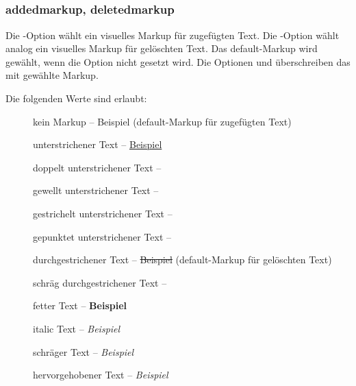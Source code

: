 \begin{chusage}
		\>\\
	\usageexample
		\> \Corresponds\ \\
		\>\\
		\>\\
		\>
\end{chusage}

\subsubsection{addedmarkup, deletedmarkup}

Die -Option wählt ein visuelles Markup für zugefügten Text.
Die -Option wählt analog ein visuelles Markup für gelöschten Text.
Das default-Markup wird gewählt, wenn die Option nicht gesetzt wird.
Die Optionen  und  überschreiben das mit  gewählte Markup.

Die folgenden Werte sind erlaubt:
\begin{description}
	\item [] kein Markup -- Beispiel (default-Markup für zugefügten Text)
	\item [] unterstrichener Text -- \uline{Beispiel}
	\item [] doppelt unterstrichener Text -- 
	\item [] gewellt unterstrichener Text -- 
	\item [] gestrichelt unterstrichener Text -- 
	\item [] gepunktet unterstrichener Text -- 
	\item [] durchgestrichener Text -- \sout{Beispiel} (default-Markup für gelöschten Text)
	\item [] schräg durchgestrichener Text -- 
	\item [] fetter Text -- \textbf{Beispiel}
	\item [] italic Text -- \textit{Beispiel}
	\item [] schräger Text -- \textsl{Beispiel}
	\item [] hervorgehobener Text -- \emph{Beispiel}
\end{description}

